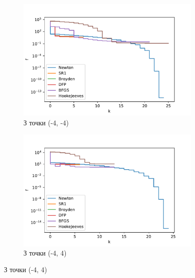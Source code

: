 \begin{figure}[h!]
    \begin{subfigure}{0.5\textwidth}
        \includegraphics[width=\textwidth, trim=0cm 0cm 1.2cm 1cm, clip]{assets/descent_steps/rosenbrock_steps_0.pdf}
        \caption{З точки (-4, -4)}
    \end{subfigure}
    \begin{subfigure}{0.5\textwidth}
        \includegraphics[width=\textwidth, trim=0cm 0cm 1.2cm 1cm, clip]{assets/descent_steps/rosenbrock_steps_1.pdf}
        \caption{З точки (-4, 4)}
    \end{subfigure}
\end{figure}
